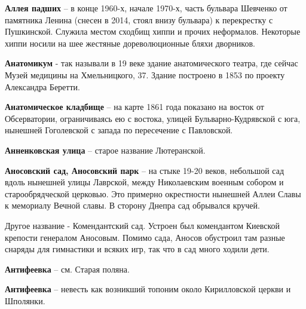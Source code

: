 \medskip

\textbf{Аллея падших} – в конце 1960-х, начале 1970-х, часть бульвара Шевченко от памятника Ленина (снесен в 2014, стоял внизу бульвара) к перекрестку с Пушкинской. Служила местом сходбищ хиппи и прочих неформалов. Некоторые хиппи носили на шее жестяные дореволюционные бляхи дворников.\\

\medskip

\textbf{Анатомикум} - так называли в 19 веке здание анатомического театра, где сейчас Музей медицины на Хмельницкого, 37. Здание построено в 1853 по проекту Александра Беретти.\\

\medskip


\textbf{Анатомическое кладбище} – на карте 1861 года показано на восток от Обсерватории, ограничиваясь ею с востока, улицей Бульварно-Кудрявской с юга, нынешней Гоголевской с запада по пересечение с Павловской.

\medskip


\textbf{Анненковская улица} – старое название Лютеранской.\\

\medskip


\textbf{Аносовский сад, Аносовский парк} – на стыке 19-20 веков, небольшой сад вдоль нынешней улицы Лаврской, между Николаевским военным собором и старообрядческой церковью. Это примерно окрестности нынешней Аллеи Славы к мемориалу Вечной славы. В сторону Днепра сад обрывался кручей.

Другое название - Комендантский сад. Устроен был комендантом Киевской крепости генералом Аносовым. Помимо сада, Аносов обустроил там разные снаряды для гимнастики и всяких игр, так что в сад много ходили дети.\\ 

\medskip


\textbf{Антифеевка} – см. Старая поляна.\\

\medskip


\textbf{Антифеевка} – невесть как возникший топоним около Кирилловской церкви и Шполянки.\\

\medskip



